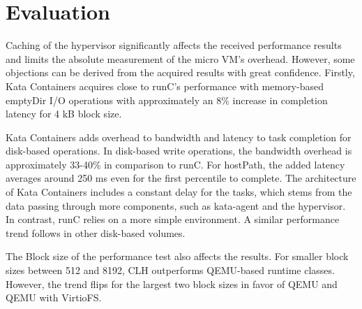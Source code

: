 \section{Evaluation}

Caching of the hypervisor significantly affects the received performance results and limits the absolute measurement of the micro VM's overhead. However, some objections can be derived from the acquired results with great confidence. Firstly, Kata Containers acquires close to runC's performance with memory-based emptyDir I/O operations with approximately an 8\% increase in completion latency for 4 kB block size. 

Kata Containers adds overhead to bandwidth and latency to task completion for disk-based operations. In disk-based write operations, the bandwidth overhead is approximately 33-40\% in comparison to runC. For hostPath, the added latency averages around 250 ms even for the first percentile to complete. The architecture of Kata Containers includes a constant delay for the tasks, which stems from the data passing through more components, such as kata-agent and the hypervisor. In contrast, runC relies on a more simple environment. A similar performance trend follows in other disk-based volumes.

The Block size of the performance test also affects the results. For smaller block sizes between 512 and 8192, CLH outperforms QEMU-based runtime classes. However, the trend flips for the largest two block sizes in favor of QEMU and QEMU with VirtioFS.